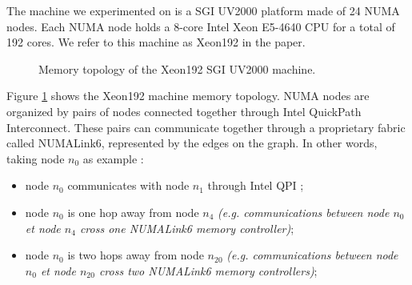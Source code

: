 \documentclass{Styles/llncs}
\begin{document}
The machine we experimented on is a SGI UV2000 platform made of 24 NUMA nodes.
Each NUMA node holds a 8-core Intel Xeon E5-4640 CPU for a total of 192 cores.
We refer to this machine as Xeon192 in the paper. 

\begin{figure}
\begin{center}
\end{center}
\caption{Memory topology of the Xeon192 SGI UV2000 machine.}
\label{fig:idchire}
\end{figure}

Figure \ref{fig:idchire} shows the Xeon192 machine memory topology.
NUMA nodes are organized by pairs of nodes connected together through Intel QuickPath Interconnect.
These pairs can communicate together through a proprietary fabric called NUMALink6, represented by the edges on the graph.
In other words, taking node $n_0$ as example :
\begin{itemize}
\item node $n_0$ communicates with node $n_1$ through Intel QPI ;
\item node $n_0$ is one hop away from node $n_4$ \emph{(e.g. communications between node $n_0$ et node $n_4$ cross one NUMALink6 memory controller)};
\item node $n_0$ is two hops away from node $n_{20}$ \emph{(e.g. communications between node $n_0$ et node $n_{20}$ cross two NUMALink6 memory controllers)};
\end{itemize}
\end{document}
